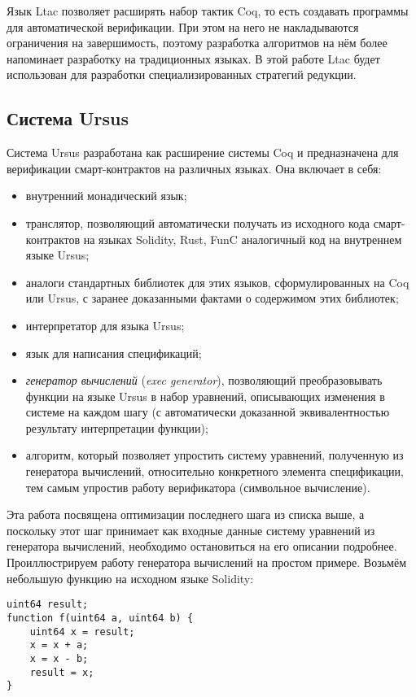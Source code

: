 \documentclass[../thesis.tex]{subfiles}
\begin{document}
Язык Ltac позволяет расширять набор тактик Coq, то есть создавать программы для автоматической верификации. При этом на него не накладываются ограничения на завершимость, поэтому разработка алгоритмов на нём более напоминает разработку на традиционных языках. В этой работе Ltac будет использован для разработки специализированных стратегий редукции.

\subsection{Система Ursus} \label{ursus}

Система Ursus разработана как расширение системы Coq и предназначена для верификации смарт-контрактов на различных языках. Она включает в себя:
\begin{itemize}
    \item внутренний монадический язык;
    \item транслятор, позволяющий автоматически получать из исходного кода смарт-контрактов на языках Solidity, Rust, FunC аналогичный код на внутреннем языке Ursus;
    \item аналоги стандартных библиотек для этих языков, сформулированных на Coq или Ursus, с заранее доказанными фактами о содержимом этих библиотек;
    \item интерпретатор для языка Ursus;
    \item язык для написания спецификаций;
    \item \textit{генератор вычислений} (\textit{exec generator}), позволяющий преобразовывать функции на языке Ursus в набор уравнений, описывающих изменения в системе на каждом шагу (с автоматически доказанной эквивалентностью результату интерпретации функции);
    \item алгоритм, который позволяет упростить систему уравнений, полученную из генератора вычислений, относительно конкретного элемента спецификации, тем самым упростив работу верификатора (символьное вычисление).
\end{itemize}

Эта работа посвящена оптимизации последнего шага из списка выше, а поскольку этот шаг принимает как входные данные систему уравнений из генератора вычислений, необходимо остановиться на его описании подробнее. Проиллюстрируем работу генератора вычислений на простом примере. Возьмём небольшую функцию на исходном языке Solidity:

\begin{verbatim}
uint64 result;
function f(uint64 a, uint64 b) {
    uint64 x = result;
    x = x + a;
    x = x - b;
    result = x;
}
\end{verbatim}
\end{document}
